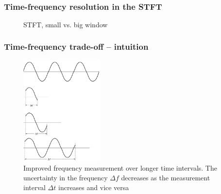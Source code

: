 \documentclass{beamer}
\begin{document}
\begin{frame}
	\frametitle{Time-frequency resolution in the STFT}
	\begin{figure}
		\centering
		\caption{STFT, small vs. big window}
	\end{figure}
\end{frame}

\begin{frame}
	\frametitle{Time-frequency trade-off -- intuition}
	\begin{figure}
		\centering
		\includegraphics[height=5.5cm]{./gabor2.png}
		\caption{Improved frequency measurement over longer time intervals. The uncertainty in the frequency $\Delta f$ decreases as the measurement interval $\Delta t$ increases and vice versa}
	\end{figure}
\end{frame}
\end{document}
